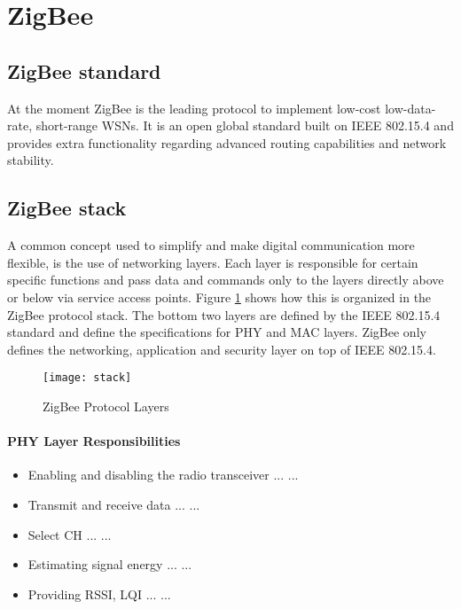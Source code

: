 \section{ZigBee}
\subsection{ZigBee standard}
At the moment ZigBee is the leading protocol to implement low-cost low-data-rate, short-range WSNs. It is an open global standard built on IEEE 802.15.4 and provides extra functionality regarding advanced routing capabilities and network stability.
\subsection{ZigBee stack}
A common concept used to simplify and make digital communication more flexible, is the use of networking layers. Each layer is responsible for certain specific functions and pass data and commands only to the layers directly above or below via service access points. Figure \ref{fig:stack} shows how this is organized in the ZigBee protocol stack.  The bottom two layers are defined by the IEEE 802.15.4 standard and define the specifications for PHY and MAC layers. ZigBee only defines the networking, application and security layer on top of IEEE 802.15.4.\\
\begin{figure}[htbp]
\centering
\texttt{[image: stack]}
\caption{ZigBee Protocol Layers}
\label{fig:stack}
\end{figure} 
\paragraph{PHY Layer Responsibilities}
\begin{itemize}
\item Enabling and disabling the radio transceiver ... ...
\item Transmit and receive data ... ...
\item Select CH ... ...
\item Estimating signal energy ... ...
\item Providing RSSI, LQI ... ...
\end{itemize}
